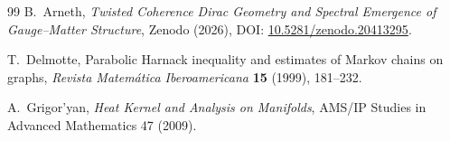 \documentclass[11pt]{article}
\begin{document}
\begin{thebibliography}{99}
B.~Arneth,
\newblock \emph{Twisted Coherence Dirac Geometry and Spectral Emergence of Gauge--Matter Structure},
\newblock Zenodo (2026),
DOI: \href{https://doi.org/10.5281/zenodo.20413295}{10.5281/zenodo.20413295}.

T.~Delmotte,
\newblock Parabolic Harnack inequality and estimates of Markov chains on graphs,
\newblock \emph{Revista Matem\'atica Iberoamericana} \textbf{15} (1999), 181--232.

A.~Grigor'yan,
\newblock \emph{Heat Kernel and Analysis on Manifolds},
\newblock AMS/IP Studies in Advanced Mathematics 47 (2009).


\end{thebibliography}
\end{document}
